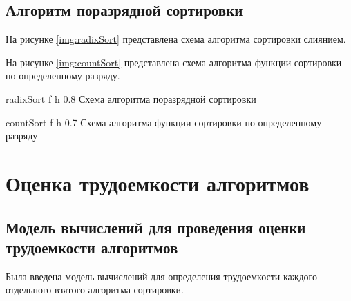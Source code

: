 \clearpage

\subsection{Алгоритм поразрядной сортировки}

На рисунке \ref{img:radixSort} представлена схема алгоритма сортировки слиянием.

На рисунке \ref{img:countSort} представлена схема алгоритма функции сортировки по определенному разряду.

{radixSort} %
{f} %
{h} %
{0.8\textwidth} %
{Схема алгоритма поразрядной сортировки} %

{countSort} %
{f} %
{h} %
{0.7\textwidth} %
{Схема алгоритма функции сортировки по определенному разряду} %

\clearpage

\section{Оценка трудоемкости алгоритмов}

\subsection{Модель вычислений для проведения оценки трудоемкости алгоритмов}

Была введена модель вычислений для определения трудоемкости каждого отдельного взятого алгоритма сортировки.

